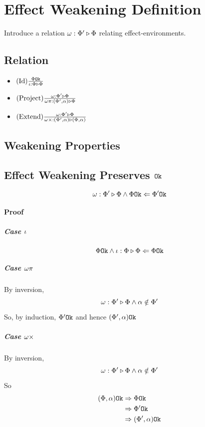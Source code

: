 \documentclass{report}
\newcommand\wrelw[2]{\wrel{\w}{#1}{#2}}
\newcommand\bi[0]{By inversion}
\begin{document}
   
\section{Effect Weakening Definition}
Introduce a relation $\omega : \Phi' \triangleright \Phi$ relating effect-environments.
\subsection{Relation}

\begin{itemize}
    \item $(\text{Id}) \frac{\Phi \texttt{Ok}}{\iota : \Phi \triangleright \Phi}$
    \item $(\text{Project}) \frac{\omega : \Phi' \triangleright \Phi}{\omega\pi : (\Phi', \alpha) \triangleright \Phi}$
    \item $(\text{Extend}) \frac{\omega : \Phi' \triangleright \Phi}{\omega\times : (\Phi', \alpha) \triangleright (\Phi, \alpha)}$
\end{itemize}
\subsection{Weakening Properties}
\subsection{Effect Weakening Preserves $\texttt{Ok}$}
\begin{equation}
    \wrelw{\P'}{\P} \wedge \ok{\P}\Leftarrow \ok{\P'}
\end{equation}

\paragraph{Proof}
\subparagraph{Case $\iota$}
$$\Phi \texttt{Ok} \wedge\iota : \Phi \triangleright \Phi \Leftarrow \Phi \texttt{Ok}$$ 
\subparagraph{Case $\omega\pi$}
\bi,
\begin{equation}
    \wrelw{\P'}{\P} \wedge \a\notin\P'
\end{equation}

So, by induction, $\Phi' \texttt{Ok}$ and hence $(\Phi', \alpha) \texttt{Ok}$

\subparagraph{Case $\omega\times$}
\bi, 
\begin{equation}
    \wrelw{\P'}{\P} \wedge \a\notin\P'
\end{equation}

So
\begin{align}
    (\Phi, \alpha) \texttt{Ok} & \Rightarrow \Phi \texttt{Ok} \\
    & \Rightarrow \Phi' \texttt{Ok}\\
    & \Rightarrow (\Phi', \alpha) \texttt{Ok}\\
\end{align}
\end{document}

